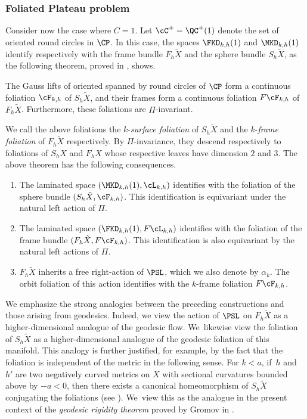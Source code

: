 \subsubsection{Foliated Plateau problem}\label{sss.FPP} Consider now the case where $C=1$. Let $\cC^+=\QC^+(1)$ denote the set of oriented round circles in $\CP$. In this case, the spaces $\FKD_{k,h}(1)$ and $\MKD_{k,h}(1)$ identify respectively with the frame bundle $F_h\tilde{X}$ and the sphere bundle $S_h\tilde{X}$, as the following theorem, proved in \cite[Th.\,2.1.3]{ALS}, shows.

\begin{theorem}\label{th_foliated_Plateau} The Gauss lifts of oriented \kdisks spanned by round circles of $\CP$ form a continuous foliation $\cF_{k,h}$ of $S_h\tilde{X}$, and their frames form a continuous foliation $F\cF_{k,h}$ of $F_h\tilde{X}$. Furthermore, these foliations are $\Pi$-invariant.
\end{theorem}

We call the above foliations the $k$-\emph{surface foliation} of $S_h\tilde{X}$ and the $k$-\emph{frame foliation} of $F_h\tilde{X}$ respectively. By $\Pi$-invariance, they descend respectively to foliations of $S_h X$ and $F_h X$ whose respective leaves have dimension $2$ and $3$. The above theorem has the following consequences.

\begin{enumerate}
\item The laminated space $(\MKD_{k,h}(1),\cL_{k,h})$ identifies with the \ksurface foliation of the sphere bundle $(S_h\tilde{X},\cF_{k,h})$. This identification is equivariant under the natural left action of $\Pi$.
\item The laminated space $(\FKD_{k,h}(1),F\cL_{k,h})$ identifies with the foliation of the frame bundle $(F_h\tilde{X},F\cF_{k,h})$. This identification is also equivariant by the natural left actions of $\Pi$.
\item $F_h\tilde{X}$ inherits a free right-action of $\PSL$, which we also denote by $\alpha_k$. The orbit foliation of this action identifies with the $k$-frame foliation $F\cF_{k,h}$.
\end{enumerate}

We emphasize the strong analogies between the preceding constructions and those arising from geodesics. Indeed, we view the action of $\PSL$ on $F_h\tilde X$ as a higher-dimensional analogue of the geodesic flow. We~likewise view the \ksurface foliation of $S_h\tilde{X}$ as a higher-dimensional analogue of the geodesic foliation of this manifold. This analogy is further justified, for example, by the fact that the \ksurface foliation is independent of the metric in the following sense. For $k<a$, if~$h$ and $h'$ are two negatively curved metrics on $X$ with sectional curvatures bounded above by \hbox{$-a<0$}, then there exists a canonical homeomorphism of $S_h\tilde{X}$ conjugating the \ksurface foliations (see \cite[Th.\,2.1.5.]{ALS}). We~view this as the analogue in the present context of the \emph{geodesic rigidity theorem} proved by Gromov in \cite{Gromov3}.

